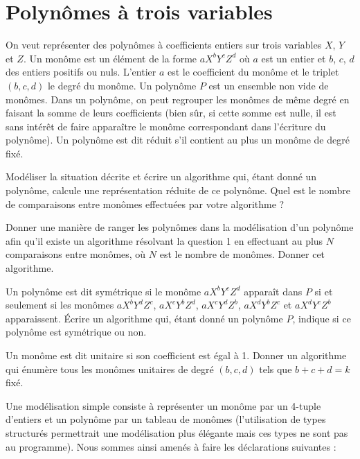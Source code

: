 \renewcommand{\SourceFile}{7-arithmetique-et-calculs-numeriques/src/7-3.ml}

\section{Polynômes à trois variables}

On veut représenter des polynômes à coefficients entiers sur trois variables $X$, $Y$ et $Z$. Un monôme est un élément de la forme $aX^bY^cZ^d$ où $a$ est un entier et $b$, $c$, $d$ des entiers positifs ou nuls. L'entier $a$ est le coefficient du monôme et le triplet $(b,c,d)$ le degré du monôme. Un polynôme $P$ est un ensemble non vide de monômes. Dans un polynôme, on peut regrouper les monômes de même degré en faisant la somme de leurs coefficients (bien sûr, si cette somme est nulle, il est sans intérêt de faire apparaître le monôme correspondant dans l'écriture du polynôme). Un polynôme est dit réduit s'il contient au plus un monôme de degré fixé.
\newpage

\Q
Modéliser la situation décrite et écrire un algorithme qui, étant donné un polynôme, calcule une représentation réduite de ce polynôme. Quel est le nombre de comparaisons entre monômes effectuées par votre algorithme ?

\Q
Donner une manière de ranger les polynômes dans la modélisation d'un polynôme afin qu'il existe un algorithme résolvant la question 1 en effectuant au plus $N$ comparaisons entre monômes, où $N$ est le nombre de monômes. Donner cet algorithme.

\Q
Un polynôme est dit symétrique si le monôme $aX^bY^cZ^d$ apparaît dans $P$ si et seulement si les monômes $aX^bY^dZ^c$, $aX^cY^bZ^d$, $aX^cY^dZ^b$, $aX^dY^bZ^c$ et $aX^dY^cZ^b$ apparaissent. Écrire un algorithme qui, étant donné un polynôme $P$, indique si ce polynôme est symétrique ou non.

\Q
Un monôme est dit unitaire si son coefficient est égal à 1. Donner un algorithme qui énumère tous les monômes unitaires de degré $(b,c,d)$ tels que $b+c+d=k$ fixé.

\Corrige

\Q
Une modélisation simple consiste à représenter un monôme par un 4-tuple d'entiers et un polynôme par un tableau de monômes (l'utilisation de types structurés permettrait une modélisation plus élégante mais ces types ne sont pas au programme). Nous sommes ainsi amenés à faire les déclarations suivantes :



